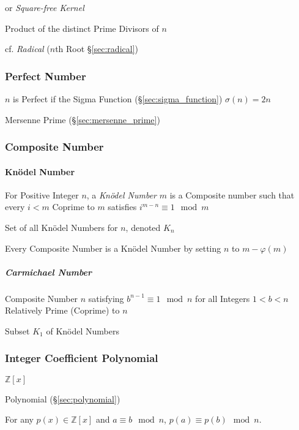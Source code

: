 or \emph{Square-free Kernel}

Product of the distinct Prime Divisors of $n$

cf. \emph{Radical} ($n$th Root \S\ref{sec:radical})



\subsubsection{Perfect Number}\label{sec:perfect_number}

$n$ is Perfect if the Sigma Function (\S\ref{sec:sigma_function})
$\sigma(n) = 2n$

Mersenne Prime (\S\ref{sec:mersenne_prime})



\subsubsection{Composite Number}\label{sec:composite_number}

\paragraph{Kn\"odel Number}\label{sec:knodel_number}\hfill

For Positive Integer $n$, a \emph{Kn\"odel Number} $m$ is a Composite
number such that every $i < m$ Coprime to $m$ satisfies $i^{m-n}
\equiv 1 \mod m$

Set of all Kn\"odel Numbers for $n$, denoted $K_n$

Every Composite Number is a Kn\"odel Number by setting $n$ to $m -
\varphi(m)$



\subparagraph{Carmichael Number}\label{sec:carmichael_number}\hfill

Composite Number $n$ satisfying $b^{n-1} \equiv 1 \mod n$ for all
Integers $1 < b < n$ Relatively Prime (Coprime) to $n$

Subset $K_1$ of Kn\"odel Numbers



\subsubsection{Integer Coefficient Polynomial}
\label{sec:integer_coefficient}

$\mathbb{Z}[x]$

Polynomial (\S\ref{sec:polynomial})

For any $p(x) \in \mathbb{Z}[x]$ and $a \equiv b \mod n$, $p(a) \equiv
p(b) \mod n$.

